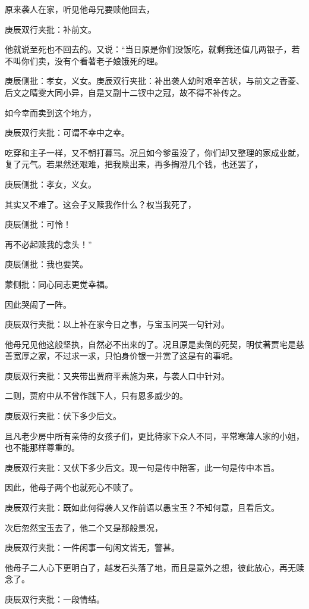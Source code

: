 \begin{parag}
    原来袭人在家，听见他母兄要赎他回去，\begin{note}庚辰双行夹批：补前文。\end{note}他就说至死也不回去的。又说：“当日原是你们没饭吃，就剩我还值几两银子，若不叫你们卖，没有个看著老子娘饿死的理。\begin{note}庚辰侧批：孝女，义女。庚辰双行夹批：补出袭人幼时艰辛苦状，与前文之香菱、后文之晴雯大同小异，自是又副十二钗中之冠，故不得不补传之。\end{note}如今幸而卖到这个地方，\begin{note}庚辰双行夹批：可谓不幸中之幸。\end{note}吃穿和主子一样，又不朝打暮骂。况且如今爹虽没了，你们却又整理的家成业就，复了元气。若果然还艰难，把我赎出来，再多掏澄几个钱，也还罢了，\begin{note}庚辰侧批：孝女，义女。\end{note}其实又不难了。这会子又赎我作什么？权当我死了，\begin{note}庚辰侧批：可怜！\end{note}再不必起赎我的念头！”\begin{note}庚辰侧批：我也要笑。\end{note}\begin{note}蒙侧批：同心同志更觉幸福。\end{note}因此哭闹了一阵。\begin{note}庚辰双行夹批：以上补在家今日之事，与宝玉问哭一句针对。\end{note}
\end{parag}


\begin{parag}
    他母兄见他这般坚执，自然必不出来的了。况且原是卖倒的死契，明仗著贾宅是慈善宽厚之家，不过求一求，只怕身价银一并赏了这是有的事呢。\begin{note}庚辰双行夹批：又夹带出贾府平素施为来，与袭人口中针对。\end{note}二则，贾府中从不曾作践下人，只有恩多威少的。\begin{note}庚辰双行夹批：伏下多少后文。\end{note}且凡老少房中所有亲侍的女孩子们，更比待家下众人不同，平常寒薄人家的小姐，也不能那样尊重的。\begin{note}庚辰双行夹批：又伏下多少后文。现一句是传中陪客，此一句是传中本旨。\end{note}因此，他母子两个也就死心不赎了。\begin{note}庚辰双行夹批：既如此何得袭人又作前语以愚宝玉？不知何意，且看后文。\end{note}次后忽然宝玉去了，他二个又是那般景况，\begin{note}庚辰双行夹批：一件闲事一句闲文皆无，警甚。\end{note}他母子二人心下更明白了，越发石头落了地，而且是意外之想，彼此放心，再无赎念了。\begin{note}庚辰双行夹批：一段情结。\end{note}
\end{parag}


